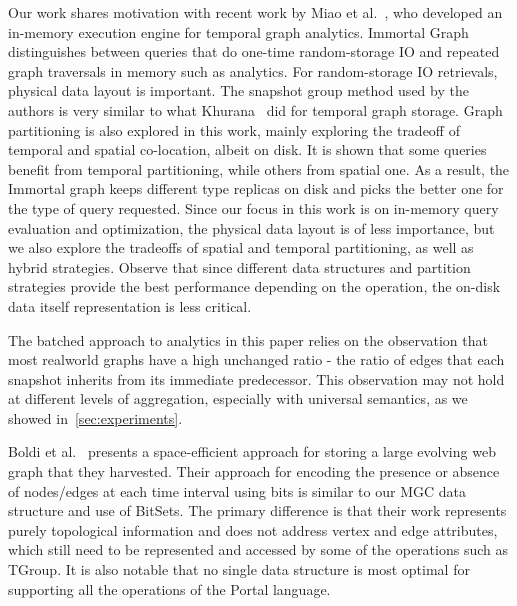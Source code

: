Our work shares motivation with recent work by Miao et
al.~\cite{DBLP:journals/tos/MiaoHLWYZPCC15}, who developed an
in-memory execution engine for temporal graph analytics.  Immortal
Graph distinguishes between queries that do one-time random-storage IO
and repeated graph traversals in memory such as analytics.  For
random-storage IO retrievals, physical data layout is important.  The
snapshot group method used by the authors is very similar to what
Khurana~\cite{Khurana2013} did for temporal graph storage.  Graph
partitioning is also explored in this work, mainly exploring the
tradeoff of temporal and spatial co-location, albeit on disk.  It is
shown that some queries benefit from temporal partitioning, while
others from spatial one.  As a result, the Immortal graph keeps
different type replicas on disk and picks the better one for the type
of query requested.  Since our focus in this work is on in-memory
query evaluation and optimization, the physical data layout is of less
importance, but we also explore the tradeoffs of spatial and temporal
partitioning, as well as hybrid strategies.  Observe that since
different data structures and partition strategies provide the best
performance depending on the operation, the on-disk data
itself representation is less critical.

The batched approach to analytics in this paper relies on the
observation that most realworld graphs have a high unchanged ratio -
the ratio of edges that each snapshot inherits from its immediate
predecessor.  This observation may not hold at different levels of
aggregation, especially with universal semantics, as we showed
in~\ref{sec:experiments}.

Boldi et al.~\cite{Boldi2008} presents a space-efficient approach for
storing a large evolving web graph that they harvested.  Their
approach for encoding the presence or absence of nodes/edges at each
time interval using bits is similar to our MGC data structure and use
of BitSets.  The primary difference is that their work represents
purely topological information and does not address vertex and edge
attributes, which still need to be represented and accessed by some of
the operations such as TGroup.  It is also notable that no single data
structure is most optimal for supporting all the operations of the
Portal language.

